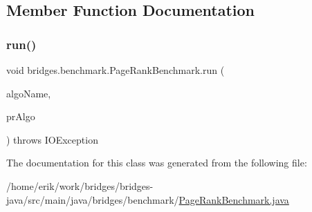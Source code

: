 \subsection{Member Function Documentation}
\mbox{\label{classbridges_1_1benchmark_1_1_page_rank_benchmark_a6738599d19f7a856a16615f69050c8b3}} 
\subsubsection{\texorpdfstring{run()}{run()}}
{\footnotesize\ttfamily void bridges.\+benchmark.\+Page\+Rank\+Benchmark.\+run (\begin{DoxyParamCaption}\item[{String}]{algo\+Name,  }\item[{Consumer$<$ \hyperlink{classbridges_1_1benchmark_1_1_page_rank_params}{Page\+Rank\+Params} $>$}]{pr\+Algo }\end{DoxyParamCaption}) throws I\+O\+Exception}



The documentation for this class was generated from the following file\+:\begin{DoxyCompactItemize}
\item 
/home/erik/work/bridges/bridges-\/java/src/main/java/bridges/benchmark/\hyperlink{_page_rank_benchmark_8java}{Page\+Rank\+Benchmark.\+java}\end{DoxyCompactItemize}

